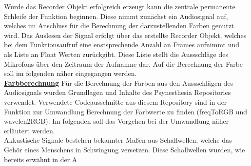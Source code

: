 Wurde das Recorder Objekt erfolgreich erzeugt kann die zentrale permanente Schleife der Funktion beginnen. Diese nimmt zunächst ein Audiosignal auf, 
welches im Anschluss für die Berechnung der darzustellenden Farben genutzt wird. Das Auslesen der Signal erfolgt über das erstellte Recorder Objekt,
welches bei dem Funktionsaufruf eine enstsprechende Anzahl an Frames aufnimmt und als Liste an Float Werten zurückgibt. Diese Liste stellt die Aussschläge 
des Mikrofons über den Zeitraum der Aufnahme dar. Auf die Berechnung der Farbe soll im folgenden näher eingegangen werden.\\

\textbf{\underline{Farbberechnung}}
Für die Berechnung der Farben aus den Aussschlägen des Audiosignals wurden Grundlagen und Inhalte des Psynesthesia Repositories verwendet. Verwendete Codeausschnitte aus 
diesem Repository sind in der Funktion zur Umwandlung Berechnung der Farbwerte zu finden (freqToRGB und wavelen2RGB). Im folgenden soll das Vorgehen bei der Umwandlung näher erläutert
werden. \\
Akkustische Signale bestehen bekannter Maßen aus Schallwellen, welche das Gehör eines Menschens in Schwingung versetzen. Diese Schallwellen wurden, wie bereits erwähnt in der A





